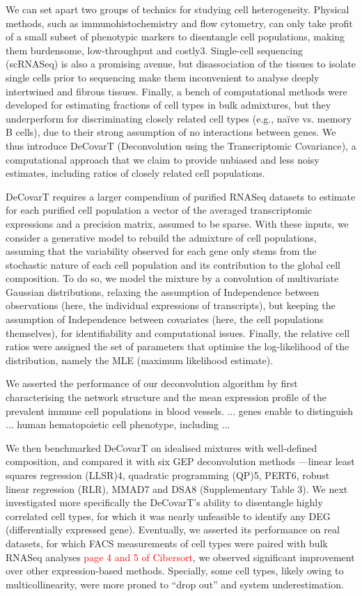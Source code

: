 \documentclass[long, final]{jobim}
\begin{document}
We can set apart two groups of technics for studying cell heterogeneity. Physical methods, such as immunohistochemistry and flow cytometry, can only take profit of a small subset of phenotypic markers to disentangle cell populations, making them burdensome, low-throughput and costly3. Single-cell sequencing (scRNASeq) is also a promising avenue, but disassociation of the tissues to isolate single cells prior to sequencing make them inconvenient to analyse deeply intertwined and fibrous tissues. Finally, a bench of computational methods were developed for estimating fractions of cell types in bulk admixtures, but they underperform for discriminating closely related cell types (e.g., naïve vs. memory B cells), due to their strong assumption of no interactions between genes. We thus introduce DeCovarT (Deconvolution using the Transcriptomic Covariance), a computational approach that we claim to provide unbiased and less noisy estimates, including ratios of closely related cell populations.


DeCovarT requires a larger compendium of purified RNASeq datasets to estimate for each purified cell population a vector of the averaged transcriptomic expressions and a precision matrix, assumed to be sparse.  With these inputs, we consider a generative model to rebuild the admixture of cell populations, assuming that the variability observed for each gene only stems from the stochastic nature of each cell population and its contribution to the global cell composition. To do so, we model the mixture by a convolution of multivariate Gaussian distributions, relaxing the assumption of Independence between observations (here, the individual expressions of transcripts), but keeping the assumption of Independence between covariates (here, the cell populations themselves), for identifiability and computational issues. Finally, the relative cell ratios were assigned the set of parameters that optimise the log-likelihood of the distribution, namely the MLE (maximum likelihood estimate).

We asserted the performance of our deconvolution algorithm by first characterising the network structure and the mean expression profile of the prevalent immune cell populations in blood vessels. ... genes enable to distinguish ... human hematopoietic cell phenotype, including ...

We then benchmarked DeCovarT on idealised mixtures with well-defined composition, and compared it with six GEP deconvolution methods —linear least squares regression (LLSR)4, quadratic programming (QP)5, PERT6, robust linear regression (RLR), MMAD7 and DSA8 (Supplementary Table 3). We next investigated more specifically the DeCovarT’s ability to disentangle highly correlated cell types, for which it was nearly unfeasible to identify any DEG (differentially expressed gene). Eventually, we asserted its performance on real datasets, for which FACS measurements of cell types were paired with bulk RNASeq analyses \textcolor{red}{page 4 and 5 of Cibersort}, we observed significant improvement over  other expression-based methods. Specially, some cell types, likely owing to multicollinearity, were more proned to \enquote{drop out} and system underestimation.
\end{document}
